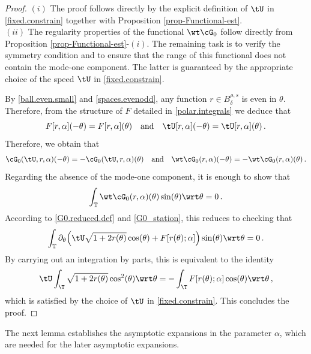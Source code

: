 \documentclass[a4paper,reqno,10pt]{article}
\newcommand{\pa}{\partial}
\begin{document}
\begin{proof}
    ${{(i)}}$ The proof follows directly by the explicit definition of $\tU$ in \eqref{fixed.constrain} together with Proposition \ref{prop-Functional-est}.
    \\[1mm]
   ${{(ii)}}$ The regularity properties of the functional $\wt\cG_{0}$ follow directly from Proposition \ref{prop-Functional-est}-$(i)$. The remaining task is to verify the symmetry condition and to ensure that the range of this functional does not contain the mode-one component. The latter is guaranteed by the appropriate choice of the speed $\tU$ in \eqref{fixed.constrain}.
   
   By \eqref{ball.even.small} and \eqref{spaces.evenodd}, any function $r\in B_\delta^{\rho,s}$ is even in $\theta$. Therefore, from the structure of $F$ detailed in \eqref{polar.integrals} we deduce that
   $$
   F[r,\alpha](-\theta)=F[r,\alpha](\theta)\quad\hbox{and}\quad \tU[r,\alpha](-\theta)=\tU[r,\alpha](\theta) \,.
   $$
   Therefore, we obtain  that
   $$
   \cG_0(\tU,r,\alpha)(-\theta)=-\cG_0(\tU,r,\alpha)(\theta)\quad\hbox{and}\quad \wt\cG_0(r,\alpha)(-\theta)=-\wt\cG_0(r,\alpha)(\theta) \,.$$
   Regarding the absence of the mode-one component, it is enough to show that
   $$
   \int_{\mathbb{T}}\wt\cG_0(r,\alpha)(\theta)\sin(\theta)\wrt\theta=0 \,.
   $$
   According to \eqref{G0.reduced.def} and \eqref{G0_station}, this reduces  to checking that
   \begin{equation*}
	\begin{aligned}
	\int_{\mathbb{T}} \pa_{\theta}\Big(   \tU  \sqrt{1+2 r(\theta)}\cos(\theta) + F[ r(\theta);\alpha ] \Big) \sin(\theta) \wrt\theta = 0 \,.
	\end{aligned}
\end{equation*}
 By carrying out an integration by parts, this is equivalent to the identity
 $$
 \tU\int_{\T}\sqrt{1+2 r(\theta)}\cos^2(\theta) \wrt\theta =-\int_{\T}F[r(\theta);\alpha]\cos(\theta) \wrt \theta \,,$$
which is satisfied by the choice of $\tU$ in \eqref{fixed.constrain}. This concludes the proof.
\end{proof}
The next lemma establishes the asymptotic expansions in the parameter $\alpha$, which are needed for the later asymptotic expansions.
\end{document}
